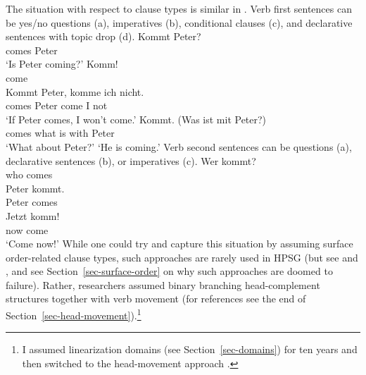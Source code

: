 \documentclass[output=paper]{langsci/langscibook}
\begin{document}
The situation with respect to clause types is similar in . Verb first sentences can be yes/no
questions (a), imperatives (b), conditional clauses (c), and declarative
sentences with topic drop (d). 
\eal
\ex\label{ex-kommt-peter-question}
\gll Kommt Peter?\\
     comes Peter\\\german
\glt `Is Peter coming?'
\ex 
\gll Komm!\\
     come\\
\ex\label{ex-kommt-peter-conditional}
\gll Kommt Peter, komme ich nicht.\\
     comes Peter  come  I not\\
\glt `If Peter comes, I won't come.'
\ex 
\gll Kommt. (Was ist mit Peter?)\\
     comes  what is with Peter\\
\glt `What about Peter?' `He is coming.'
\zl
Verb second sentences can be questions (a), declarative sentences (b), or imperatives (c).
\eal
\ex 
\gll Wer kommt?\\
     who comes\\\german
\ex 
\gll Peter kommt.\\
     Peter comes\\
\ex 
\gll Jetzt komm!\\
     now   come\\
\glt `Come now!'
\zl
While one could try and capture this situation by assuming surface order-related clause types, such approaches are rarely
used in HPSG (but see  and , and see Section~\ref{sec-surface-order} on why such approaches
are doomed to failure). Rather, researchers assumed binary branching head-complement structures
together with verb movement (for references see the end of
Section~\ref{sec-head-movement}).\footnote{%
I assumed linearization domains (see Section~\ref{sec-domains}) for ten
years and then switched to the head-movement approach \citep{Mueller2005c,Mueller2005d,MuellerGS}.%
} 
\end{document}
